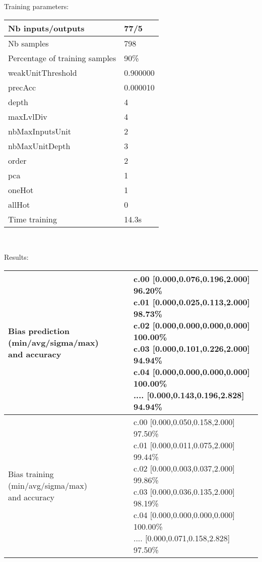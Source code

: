 Training parameters:\\
\begin{center}
\begin{tabular}{|l|l|}
\hline
Nb inputs/outputs&77/5\\
\hline
Nb samples&798\\
\hline
Percentage of training samples&90\%\\
\hline
weakUnitThreshold&0.900000\\
\hline
precAcc&0.000010\\
\hline
depth&4\\
\hline
maxLvlDiv&4\\
\hline
nbMaxInputsUnit&2\\
\hline
nbMaxUnitDepth&3\\
\hline
order&2\\
\hline
pca&1\\
\hline
oneHot&1\\
\hline
allHot&0\\
\hline
Time training&14.3s\\
\hline
\end{tabular}\\
\end{center}\newline
Results:
\begin{center}
\begin{tabular}{|l|l|}
\hline
\makecell{Bias prediction (min/avg/sigma/max)\\and accuracy}&\makecell{c.00 [0.000,0.076,0.196,2.000] 96.20\%\\
c.01 [0.000,0.025,0.113,2.000] 98.73\%\\
c.02 [0.000,0.000,0.000,0.000] 100.00\%\\
c.03 [0.000,0.101,0.226,2.000] 94.94\%\\
c.04 [0.000,0.000,0.000,0.000] 100.00\%\\
.... [0.000,0.143,0.196,2.828] 94.94\%\\
}\\

\hline
\makecell{Bias training (min/avg/sigma/max)\\and accuracy}&\makecell{c.00 [0.000,0.050,0.158,2.000] 97.50\%\\
c.01 [0.000,0.011,0.075,2.000] 99.44\%\\
c.02 [0.000,0.003,0.037,2.000] 99.86\%\\
c.03 [0.000,0.036,0.135,2.000] 98.19\%\\
c.04 [0.000,0.000,0.000,0.000] 100.00\%\\
.... [0.000,0.071,0.158,2.828] 97.50\%\\
}\\
\hline
\end{tabular}\
\end{center}
